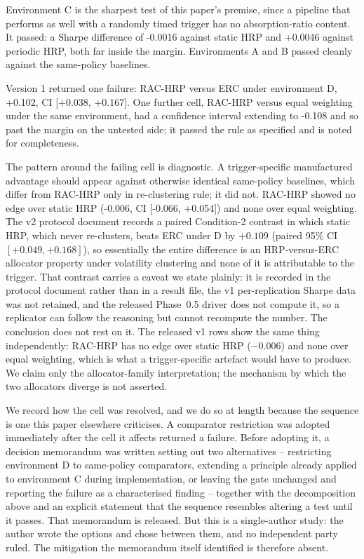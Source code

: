 \documentclass[12pt,letterpaper]{article}
\begin{document}
Environment C is the sharpest test of this paper's premise, since a pipeline that
performs as well with a randomly timed trigger has no absorption-ratio content. It
passed: a Sharpe difference of -0.0016 against static HRP and +0.0046 against periodic
HRP, both far inside the margin. Environments A and B passed cleanly against the
same-policy baselines.

Version 1 returned one failure: RAC-HRP versus ERC under environment D, +0.102, CI
[+0.038, +0.167]. One further cell, RAC-HRP versus equal weighting under the same
environment, had a confidence interval extending to -0.108 and so past the margin on the
untested side; it passed the rule as specified and is noted for completeness.

The pattern around the failing cell is diagnostic. A trigger-specific manufactured
advantage should appear against otherwise identical same-policy baselines, which differ
from RAC-HRP only in re-clustering rule; it did not. RAC-HRP showed no edge over static
HRP (-0.006, CI [-0.066, +0.054]) and none over equal weighting. The v2 protocol document records a paired Condition-2 contrast in which static
HRP, which never re-clusters, beats ERC under D by $+0.109$ (paired 95\% CI
$[+0.049, +0.168]$), so essentially the entire difference is an HRP-versus-ERC
allocator property under volatility clustering and none of it is attributable to
the trigger. That contrast carries a caveat we state plainly: it is recorded in
the protocol document rather than in a result file, the v1 per-replication Sharpe
data was not retained, and the released Phase~0.5 driver does not compute it, so a
replicator can follow the reasoning but cannot recompute the number. The
conclusion does not rest on it. The released v1 rows show the same thing
independently: RAC-HRP has no edge over static HRP ($-0.006$) and none over equal
weighting, which is what a trigger-specific artefact would have to produce. We
claim only the allocator-family interpretation; the mechanism by which the two
allocators diverge is not asserted.

We record how the cell was resolved, and we do so at length because the sequence is one
this paper elsewhere criticises. A comparator restriction was adopted immediately after
the cell it affects returned a failure. Before adopting it, a decision memorandum was
written setting out two alternatives -- restricting environment D to same-policy
comparators, extending a principle already applied to environment C during
implementation, or leaving the gate unchanged and reporting the failure as a
characterised finding -- together with the decomposition above and an explicit statement
that the sequence resembles altering a test until it passes. That memorandum is released.
But this is a single-author study: the author wrote the options and chose between them,
and no independent party ruled. The mitigation the memorandum itself identified is
therefore absent.
\end{document}
